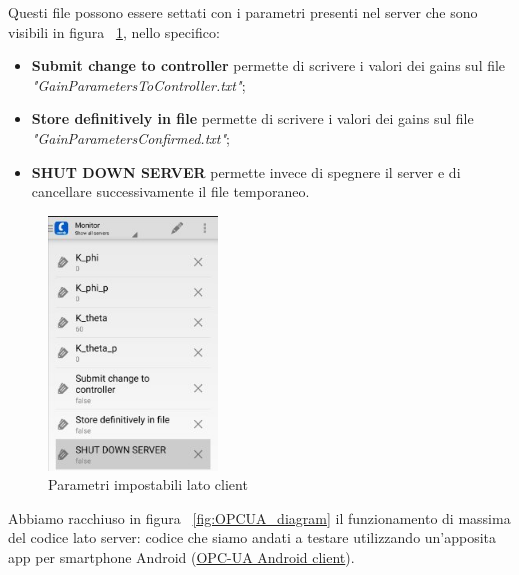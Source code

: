 Questi file possono essere settati con i parametri presenti nel server che sono visibili in figura ~\ref{fig:OPCUA_params}, nello specifico:
\begin{itemize}
	\item \textbf{Submit change to controller} permette di scrivere i valori dei gains sul file \textit{"GainParametersToController.txt"};
	
	\item \textbf{Store definitively in file} permette di scrivere i valori dei gains sul file \textit{"GainParametersConfirmed.txt"};
	
	\item \textbf{SHUT DOWN SERVER} permette invece di spegnere il server e di cancellare successivamente il file temporaneo.
\end{itemize}

\begin{figure}[h]
	\centering   	
	\includegraphics[width=0.4\textwidth]{Immagini/OPC_UA_params.jpg}
	\caption{Parametri impostabili lato client}
	\label{fig:OPCUA_params}
\end{figure}


Abbiamo racchiuso in figura ~\ref{fig:OPCUA_diagram} il funzionamento di massima del codice lato server: codice che siamo andati a testare utilizzando un'apposita app per smartphone Android (\href{https://play.google.com/store/apps/details?id=com.prosysopc.ua.android2&hl=it}{OPC-UA Android client}).

